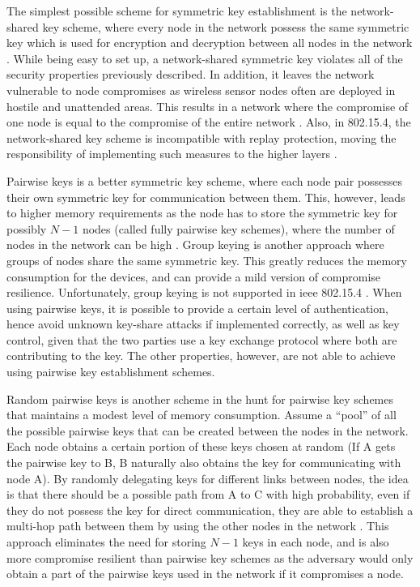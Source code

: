 The simplest possible scheme for symmetric key establishment is the network-shared key scheme, where every node in the network possess the same symmetric key which is used for encryption and decryption between all nodes in the network \cite{perrig2004security}. While being easy to set up, a network-shared symmetric key violates all of the security properties previously described. In addition, it leaves the network vulnerable to node compromises as wireless sensor nodes often are deployed in hostile and unattended areas. This results in a network where the compromise of one node is equal to the compromise of the entire network \cite{krentz20136lowpan}. Also, in 802.15.4, the network-shared key scheme is incompatible with replay protection, moving the responsibility of implementing such measures to the higher layers \cite{sastry2004security}.



Pairwise keys is a better symmetric key scheme, where each node pair possesses their own symmetric key for communication between them. This, however, leads to higher memory requirements as the node has to store the symmetric key for possibly $N-1$ nodes (called fully pairwise key schemes), where the number of nodes in the network can be high \cite{perrig2004security}. Group keying is another approach where groups of nodes share the same symmetric key. This greatly reduces the memory consumption for the devices, and can provide a mild version of compromise resilience. Unfortunately, group keying is not supported in \gls{ieee} 802.15.4 \cite{sastry2004security}. When using pairwise keys, it is possible to provide a certain level of authentication, hence avoid unknown key-share attacks if implemented correctly, as well as key control, given that the two parties use a key exchange protocol where both are contributing to the key. The other properties, however, are not able to achieve using pairwise key establishment schemes. 

Random pairwise keys is another scheme in the hunt for pairwise key schemes that maintains a modest level of memory consumption. Assume a ``pool'' of all the possible pairwise keys that can be created between the nodes in the network. Each node obtains a certain portion of these keys chosen at random (If A gets the pairwise key to B, B naturally also obtains the key for communicating with node A). By randomly delegating keys for different links between nodes, the idea is that there should be a possible path from A to C with high probability, even if they do not possess the key for direct communication, they are able to establish a multi-hop path between them by using the other nodes in the network \cite{liu2005establishing}. This approach eliminates the need for storing $N-1$ keys in each node, and is also more compromise resilient than pairwise key schemes as the adversary would only obtain a part of the pairwise keys used in the network if it compromises a node. 


